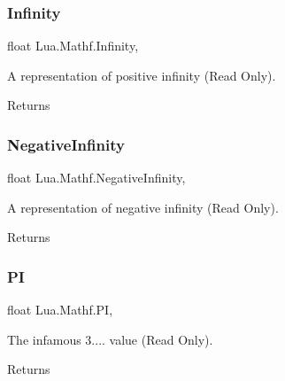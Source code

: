\subsubsection{\texorpdfstring{Infinity}{Infinity}}
{\footnotesize\ttfamily float Lua.\+Mathf.\+Infinity\hspace{0.3cm}{\ttfamily [static]}, {\ttfamily [get]}}



A representation of positive infinity (Read Only). 

\begin{DoxyReturn}{Returns}

\end{DoxyReturn}
\mbox{\label{class_lua_1_1_mathf_a0f4a13d448b3d1a96f3aaff159d6636b}} 
\subsubsection{\texorpdfstring{NegativeInfinity}{NegativeInfinity}}
{\footnotesize\ttfamily float Lua.\+Mathf.\+Negative\+Infinity\hspace{0.3cm}{\ttfamily [static]}, {\ttfamily [get]}}



A representation of negative infinity (Read Only). 

\begin{DoxyReturn}{Returns}

\end{DoxyReturn}
\mbox{\label{class_lua_1_1_mathf_a408b4fa7c06dd48e2aa0d6fcde7adedc}} 
\subsubsection{\texorpdfstring{PI}{PI}}
{\footnotesize\ttfamily float Lua.\+Mathf.\+PI\hspace{0.3cm}{\ttfamily [static]}, {\ttfamily [get]}}



The infamous 3.... value (Read Only). 

\begin{DoxyReturn}{Returns}

\end{DoxyReturn}
\mbox{\label{class_lua_1_1_mathf_aed19ee907a834cbea518af347c4f39d7}} 
